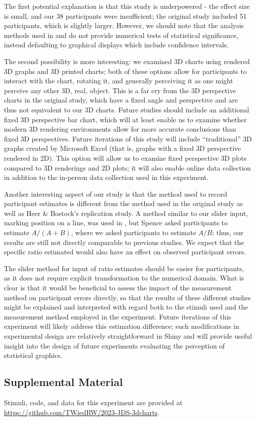 \documentclass[letterpaper,inpress,dvipsnames]{jdsart}
\begin{document}
The first potential explanation is that this study is underpowered - the effect size is small, and our 38 participants were insufficient; the original study included 51 participants, which is slightly larger. However, we should note that the analysis methods used in \citet{heerCrowdsourcingGraphicalPerception2010b} and \citet{clevelandGraphical1984} do not provide numerical tests of statistical significance, instead defaulting to graphical displays which include confidence intervals.

The second possibility is more interesting: we examined 3D charts using rendered 3D graphs and 3D printed charts; both of these options allow for participants to interact with the chart, rotating it, and generally perceiving it as one might perceive any other 3D, real, object.
This is a far cry from the 3D perspective charts in the original study, which have a fixed angle and perspective and are thus not equivalent to our 3D charts.
Future studies should include an additional fixed 3D perspective bar chart, which will at least enable us to examine whether modern 3D rendering environments allow for more accurate conclusions than fixed 3D perspectives. Future iterations of this study will include ``traditional'' 3D graphs created by Microsoft Excel (that is, graphs with a fixed 3D perspective rendered in 2D). This option will allow us to examine fixed perspective 3D plots compared to 3D renderings and 2D plots; it will also enable online data collection in addition to the in-person data collection used in this experiment.

Another interesting aspect of our study is that the method used to record participant estimates is different from the method used in the original study as well as Heer \& Bostock's replication study.
A method similar to our slider input, marking position on a line, was used in \citet{spenceVisualPsychophysicsSimple1990}, but Spence asked participants to estimate \(A/(A+B)\), where we asked participants to estimate \(A/B\); thus, our results are still not directly comparable to previous studies.
We expect that the specific ratio estimated would also have an effect on observed participant errors.

The slider method for input of ratio estimates should be easier for participants, as it does not require explicit transformation to the numerical domain.
What is clear is that it would be beneficial to assess the impact of the measurement method on participant errors directly, so that the results of these different studies might be explained and interpreted with regard both to the stimuli used and the measurement method employed in the experiment.
Future iterations of this experiment will likely address this estimation difference; such modifications in experimental design are relatively straightforward in Shiny and will provide useful insight into the design of future experiments evaluating the perception of statistical graphics.

\hypertarget{supplemental-material}{%
\subsection{Supplemental Material}\label{supplemental-material}}

Stimuli, code, and data for this experiment are provided at \url{https://github.com/TWiedRW/2023-JDS-3dcharts}.



\end{document}
